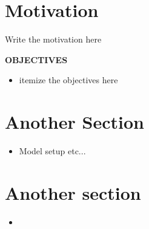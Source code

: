 \documentclass[a0,portrait]{a0poster}
\begin{document}
\begin{multicols}{3} \setlength{\columnseprule}{0pt}





\color{DarkSlateGray} %

\section*{Motivation}
Write the motivation here
\linebreak
\begin{tcolorbox}
\Large  \textbf{OBJECTIVES}
\begin{itemize}
\item  itemize the objectives here
\end{itemize}
\end{tcolorbox}
\color{DarkSlateGray} 
\section*{Another Section}

\begin{itemize}\small
 \item Model setup etc...
\end{itemize}
 
\section*{Another section}
\begin{center}%
\end{center}%

\begin{itemize}\small
\item 
\end{itemize}

\end{multicols}
\end{document}
